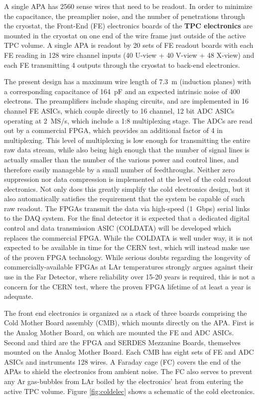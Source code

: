 A single APA has 2560 sense wires that need to be readout.  In order to minimize the capacitance, the preamplier noise, and the number of penetrations through the cryostat, the Front-End (FE) electronics boards of the {\bf TPC electronics} are mounted in the cryostat on one end of the wire frame just outside of the active TPC volume.  A single APA is readout by 20 sets of FE readout boards with each FE reading in 128 wire channel inputs (40 U-view + 40 V-view + 48 X-view) and each FE transmitting 4 outputs through the cryostat to back-end electronics.
 
The present design has a maximum wire length of 7.3~m (induction planes)
with a corresponding capacitance of 164~pF and an expected intrinsic noise of 400 electrons.
The preamplifiers include shaping circuits, and are implemented in 16 channel FE ASICs, which couple directly to 16 channel, 12 bit ADC ASICs operating at 2~MS/s, which include a 1:8 multiplexing stage.
The ADCs are read out by a commercial FPGA, which provides an additional factor of 4 in multiplexing.
This level of multiplexing is low enough for transmitting the entire raw data stream,
while also being high enough that the number of signal lines is actually smaller than the number of the various
power and control lines, and therefore easily manageble by a small number of feedthroughs.
Neither zero suppression nor data compression is implemented at the level of the cold readout electronics.
Not only does this greatly simplify the cold electronics design,
but it also automatically satisfies the requirement that the system be capable of such raw readout.
The FPGAs transmit the data via high-speed (1~Gbps) serial links to the DAQ system.
For the final detector it is expected that a dedicated digital control and data transmission ASIC (COLDATA) will be developed which
replaces the commercial FPGA.
While the COLDATA is well under way, it is not expected to be available in time for the CERN test,
which will instead make use of the proven FPGA technology.
While serious doubts regarding the longevity of commercially-available FPGAs at LAr temperatures strongly argues against
their use in the Far Detector, where reliability over 15-20 years is required,
this is not a concern for the CERN test, where the proven FPGA lifetime of at least a year is adequate.

The front end electronics is organized as a stack of three boards comprising the Cold Mother Board assembly (CMB),
which mounts directly on the APA.
First is the Analog Mother Board, on which are mounted the FE and ADC ASICs.
Second and third are the FPGA and SERDES Mezzanine Boards, themselves mounted on the Analog Mother Board.
Each CMB has eight sets of FE and ADC ASICs and instruments 128 wires.
A Faraday cage (FC) covers the end of the APAs to shield the electronics from ambient noise.
The FC also serves to prevent any Ar gas-bubbles from LAr boiled by the electronics' heat from entering the active TPC volume.
Figure \ref{fig:coldelec} shows a schematic of the cold electronics. 

